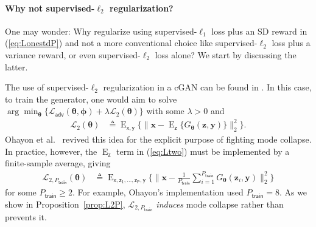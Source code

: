 \documentclass{article}
\theoremstyle{plain}
\theoremstyle{definition}
\theoremstyle{remark}
\renewcommand{\hat}{\widehat}
\newcommand{\defn}{\triangleq}
\newcommand{\hvec}[1]{\ensuremath{\Hat{\boldsymbol{#1}}}}
\renewcommand{\vec}[1]{\ensuremath{\boldsymbol{#1}}}
\newcommand{\mc}[1]{\ensuremath{\mathcal{#1}}}
\DeclareMathOperator{\E}{E}
\renewcommand{\eqref}[1]{(\ref{eq:#1})}
\newcommand{\propref}[1]{Proposition~\ref{prop:#1}}
\newcommand{\pxgy}{p_{\mathsf{x}|\mathsf{y}}}
\newcommand{\pz}{p_{\mathsf{z}}}
\newcommand{\pxhgy}{p_{\hat{\mathsf{x}}|\mathsf{y}}}
\newcommand{\Exgy}{\E_{\mathsf{x}|\mathsf{y}}}
\newcommand{\Exy}{\E_{\mathsf{x,y}}}
\newcommand{\Ez}{\E_{\mathsf{z}}}
\newcommand{\ExzPy}{\E_{\mathsf{x,z_1,...,z_P,y}}}
\newcommand{\train}{_{\mathsf{train}}}
\newcommand{\Ladv}{\mc{L}_{\mathsf{adv}}}
\newcommand{\Ltwo}{\mc{L}_2}
\newcommand{\LtwoPt}{\mc{L}_{2,P\train}}
\begin{document}
\paragraph{Why not supervised-\texorpdfstring{$\ell_2$}{L2} regularization?} 
One may wonder: Why regularize using supervised-$\ell_1$ loss plus an SD reward in \eqref{LonestdP} and not a more conventional choice like supervised-$\ell_2$ loss plus a variance reward, or even supervised-$\ell_2$ loss alone?
We start by discussing the latter.

The use of supervised-$\ell_2$ regularization in a cGAN can be found in \cite{Isola:CVPR:17}.
In this case, to train the generator, one would aim to solve $\arg\min_{\vec{\theta}} \{\Ladv(\vec{\theta},\vec{\phi}) + \lambda \Ltwo(\vec{\theta})\}$ with some $\lambda>0$ and
\begin{align}
\Ltwo(\vec{\theta})
&\defn \Exy\big\{ \|\vec{x}-\Ez\{G_{\vec{\theta}}(\vec{z},\vec{y})\}\|^2_2 \big\}
\label{eq:Ltwo} .
\end{align}
Ohayon et al.~\cite{Ohayon:ICCVW:21} revived this idea for the explicit purpose of fighting mode collapse.
In practice, however, the $\Ez$ term in \eqref{Ltwo} must be implemented by a finite-sample average, giving
\begin{align}
\LtwoPt(\vec{\theta})
&\defn \textstyle \ExzPy\big\{ \big\|\vec{x}-\frac{1}{P\train}\sum_{i=1}^{P\train} G_{\vec{\theta}}(\vec{z}_i,\vec{y}) \big\|^2_2 \big\} 
\label{eq:LtwoP} 
\end{align}
for some $P\train\geq 2$.
For example, Ohayon's implementation \cite{Ohayon:github:21} used $P\train=8$.
As we show in \propref{L2P}, $\LtwoPt$ \emph{induces} mode collapse rather than prevents it. 
\end{document}
